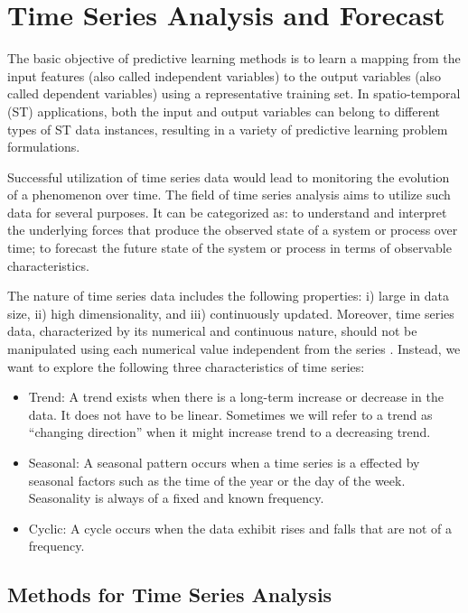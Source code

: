 \section{Time Series Analysis and Forecast}
\label{Sec:TimeSeriesForecast}

The basic objective of predictive learning methods is to learn a mapping from the input features (also called independent variables) to the output variables (also called dependent variables) using a representative training set. In spatio-temporal (ST) applications, both the input and output variables can belong to different types of ST data instances, resulting in a variety of predictive learning problem formulations.

Successful utilization of time series data would lead to monitoring the evolution of a phenomenon over time. The field of time series analysis aims to utilize such data for several purposes. It can be categorized as: to understand and interpret the underlying forces that produce the observed state of a system or process over time; to forecast the future state of the system or process in terms of observable characteristics.

The nature of time series data includes the following properties: i) large in data size, ii) high dimensionality, and iii) continuously updated. Moreover, time series data, characterized by its numerical and continuous nature, should not be manipulated using each numerical value independent from the series \cite{Pal2017}. Instead, we want to explore the following three characteristics of time series:

\begin{itemize}
	\item Trend: A trend exists when there is a long-term increase or decrease in the data. It does not have to be linear. Sometimes we will refer to a trend as ``changing direction'' when it might increase trend to a decreasing trend.
	\item Seasonal: A seasonal pattern occurs when a time series is a effected by seasonal factors such as the time of the year or the day of the week. Seasonality is always of a fixed and known frequency. 
	\item Cyclic: A cycle occurs when the data exhibit rises and falls that are not of a frequency.
\end{itemize}

\subsection{Methods for Time Series Analysis}
\label{Sec:MethodsTSA}


